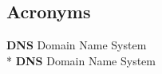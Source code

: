 \documentclass[a4paper,twoside,12pt]{report}
\begin{document}
\renewcommand{\contentsname}{Index}
\renewcommand{\bibname}{References}
\begin{spacing}{1.5}
\tableofcontents

\listoftables

\listoffigures

\chapter*{Acronyms}
\textbf{DNS} Domain Name System
\\*
\textbf{DNS} Domain Name System

\end{spacing}

\newpage
{}
\end{document}
